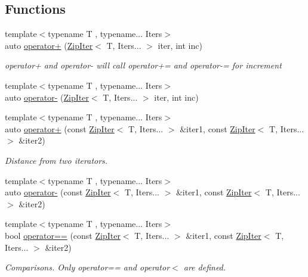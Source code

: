\subsection*{Functions}
\begin{DoxyCompactItemize}
\item 
{\footnotesize template$<$typename T , typename... Iters$>$ }\\auto \hyperlink{namespaceit_ae3e2b700f5c415f9716eeca77de40f4e}{operator+} (\hyperlink{classit_1_1ZipIter}{Zip\+Iter}$<$ T, Iters... $>$ iter, int inc)
\begin{DoxyCompactList}\small\item\em \textquotesingle{}operator+\textquotesingle{} and \textquotesingle{}operator-\/\textquotesingle{} will call \textquotesingle{}operator+=\textquotesingle{} and \textquotesingle{}operator-\/=\textquotesingle{} for increment \end{DoxyCompactList}\item 
{\footnotesize template$<$typename T , typename... Iters$>$ }\\auto \hyperlink{namespaceit_a5ff256dae1a1aa8e2831d30d60e0f78c}{operator-\/} (\hyperlink{classit_1_1ZipIter}{Zip\+Iter}$<$ T, Iters... $>$ iter, int inc)
\item 
{\footnotesize template$<$typename T , typename... Iters$>$ }\\auto \hyperlink{namespaceit_afcc29ebadd551765c7fffbb18b84adbf}{operator+} (const \hyperlink{classit_1_1ZipIter}{Zip\+Iter}$<$ T, Iters... $>$ \&iter1, const \hyperlink{classit_1_1ZipIter}{Zip\+Iter}$<$ T, Iters... $>$ \&iter2)
\begin{DoxyCompactList}\small\item\em Distance from two iterators. \end{DoxyCompactList}\item 
{\footnotesize template$<$typename T , typename... Iters$>$ }\\auto \hyperlink{namespaceit_aeb4599bb226f6b4819451b1f1bcd4493}{operator-\/} (const \hyperlink{classit_1_1ZipIter}{Zip\+Iter}$<$ T, Iters... $>$ \&iter1, const \hyperlink{classit_1_1ZipIter}{Zip\+Iter}$<$ T, Iters... $>$ \&iter2)
\item 
{\footnotesize template$<$typename T , typename... Iters$>$ }\\bool \hyperlink{namespaceit_a35d7fe94abbbb906c0b65aabd31dbfd3}{operator==} (const \hyperlink{classit_1_1ZipIter}{Zip\+Iter}$<$ T, Iters... $>$ \&iter1, const \hyperlink{classit_1_1ZipIter}{Zip\+Iter}$<$ T, Iters... $>$ \&iter2)
\begin{DoxyCompactList}\small\item\em Comparisons. Only \textquotesingle{}operator==\textquotesingle{} and \textquotesingle{}operator$<$\textquotesingle{} are defined. \end{DoxyCompactList}\item 

\end{DoxyCompactItemize}

